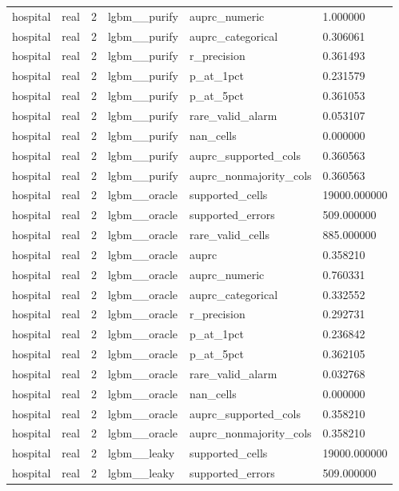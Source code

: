 \begin{tabular}{llllll}
hospital & real & 2 & lgbm\_\_purify & auprc\_numeric & 1.000000 \\
hospital & real & 2 & lgbm\_\_purify & auprc\_categorical & 0.306061 \\
hospital & real & 2 & lgbm\_\_purify & r\_precision & 0.361493 \\
hospital & real & 2 & lgbm\_\_purify & p\_at\_1pct & 0.231579 \\
hospital & real & 2 & lgbm\_\_purify & p\_at\_5pct & 0.361053 \\
hospital & real & 2 & lgbm\_\_purify & rare\_valid\_alarm & 0.053107 \\
hospital & real & 2 & lgbm\_\_purify & nan\_cells & 0.000000 \\
hospital & real & 2 & lgbm\_\_purify & auprc\_supported\_cols & 0.360563 \\
hospital & real & 2 & lgbm\_\_purify & auprc\_nonmajority\_cols & 0.360563 \\
hospital & real & 2 & lgbm\_\_oracle & supported\_cells & 19000.000000 \\
hospital & real & 2 & lgbm\_\_oracle & supported\_errors & 509.000000 \\
hospital & real & 2 & lgbm\_\_oracle & rare\_valid\_cells & 885.000000 \\
hospital & real & 2 & lgbm\_\_oracle & auprc & 0.358210 \\
hospital & real & 2 & lgbm\_\_oracle & auprc\_numeric & 0.760331 \\
hospital & real & 2 & lgbm\_\_oracle & auprc\_categorical & 0.332552 \\
hospital & real & 2 & lgbm\_\_oracle & r\_precision & 0.292731 \\
hospital & real & 2 & lgbm\_\_oracle & p\_at\_1pct & 0.236842 \\
hospital & real & 2 & lgbm\_\_oracle & p\_at\_5pct & 0.362105 \\
hospital & real & 2 & lgbm\_\_oracle & rare\_valid\_alarm & 0.032768 \\
hospital & real & 2 & lgbm\_\_oracle & nan\_cells & 0.000000 \\
hospital & real & 2 & lgbm\_\_oracle & auprc\_supported\_cols & 0.358210 \\
hospital & real & 2 & lgbm\_\_oracle & auprc\_nonmajority\_cols & 0.358210 \\
hospital & real & 2 & lgbm\_\_leaky & supported\_cells & 19000.000000 \\
hospital & real & 2 & lgbm\_\_leaky & supported\_errors & 509.000000 \\

\end{tabular}
